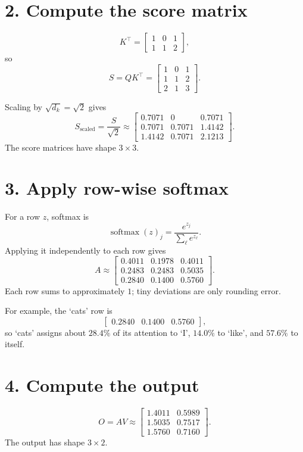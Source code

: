 \documentclass[11pt]{article}
\newcommand{\softmax}{\operatorname{softmax}}
\begin{document}
\section*{2. Compute the score matrix}

\[
K^\top=
\begin{bmatrix}
1&0&1\\
1&1&2
\end{bmatrix},
\]
so
\[
S=QK^\top=
\begin{bmatrix}
1&0&1\\
1&1&2\\
2&1&3
\end{bmatrix}.
\]

Scaling by $\sqrt{d_k}=\sqrt{2}$ gives
\[
S_{\mathrm{scaled}}
=\frac{S}{\sqrt{2}}
\approx
\begin{bmatrix}
0.7071&0&0.7071\\
0.7071&0.7071&1.4142\\
1.4142&0.7071&2.1213
\end{bmatrix}.
\]
The score matrices have shape $3\times3$.

\section*{3. Apply row-wise softmax}

For a row $z$, softmax is
\[
\softmax(z)_j=\frac{e^{z_j}}{\sum_\ell e^{z_\ell}}.
\]
Applying it independently to each row gives
\[
A\approx
\begin{bmatrix}
0.4011&0.1978&0.4011\\
0.2483&0.2483&0.5035\\
0.2840&0.1400&0.5760
\end{bmatrix}.
\]
Each row sums to approximately $1$; tiny deviations are only rounding error.

For example, the `cats' row is
\[
\begin{bmatrix}0.2840&0.1400&0.5760\end{bmatrix},
\]
so `cats' assigns about $28.4\%$ of its attention to `I', $14.0\%$ to `like', and $57.6\%$ to itself.

\section*{4. Compute the output}

\[
O=AV
\approx
\begin{bmatrix}
1.4011&0.5989\\
1.5035&0.7517\\
1.5760&0.7160
\end{bmatrix}.
\]
The output has shape $3\times2$.
\end{document}
